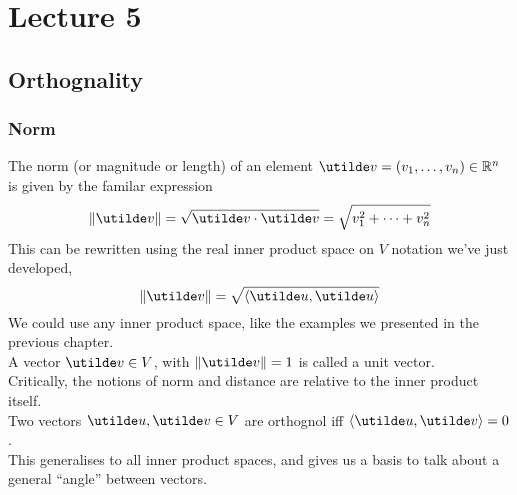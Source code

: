 \documentclass{report}
\begin{document}
\section{Lecture 5}
\subsection{Orthognality}
\subsubsection{Norm}
The norm (or magnitude or length) of an element $\ut{v} = \bracks{v_1,\dots,v_n}\in\bbr^n$ is given by the familar expression
$$
  \norm{\ut{v}} = \sqrt{\ut{v}\cd\ut{v}} = \sqrt{v_1^2 + \dots + v_n^2}
$$
This can be rewritten using the real inner product space on $V$ notation we've just developed,
$$
  \norm{\ut{v}} = \sqrt{\brangle{\ut{u}, \ut{u}}}
$$
We could use any inner product space, like the examples we presented in the previous chapter. \\
 A vector $\ut{v}\in V$, with $\norm{\ut{v}}=1$ is called a unit vector. \\
Critically, the notions of norm and distance are relative to the inner product itself. \\

 Two vectors $\ut{u},\ut{v}\in V$ are orthognol iff $\brangle{\ut{u},\ut{v}} = 0$. \\
This generalises to all inner product spaces, and gives us a basis to talk about a general ``angle'' between vectors.

\end{document}
